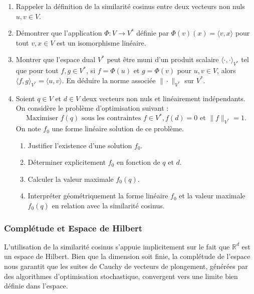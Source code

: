 \documentclass[11pt,a4paper]{report}
\begin{document}
\begin{enumerate}
\def\labelenumi{\arabic{enumi}.}

\item
  Rappeler la définition de la similarité cosinus entre deux vecteurs
  non nuls \(u, v \in V\).
\item
  Démontrer que l'application \(\Phi: V \to V^*\) définie par
  \(\Phi(v)(x) = \langle v, x \rangle\) pour tout \(v, x \in V\) est un
  isomorphisme linéaire.
\item
  Montrer que l'espace dual \(V^*\) peut être muni d'un produit scalaire
  \(\langle \cdot, \cdot \rangle_{V^*}\) tel que pour tout
  \(f, g \in V^*\), si \(f = \Phi(u)\) et \(g = \Phi(v)\) pour
  \(u, v \in V\), alors
  \(\langle f, g \rangle_{V^*} = \langle u, v \rangle\). En déduire la
  norme associée \(\|\cdot\|_{V^*}\) sur \(V^*\).
\item
  Soient \(q \in V\) et \(d \in V\) deux vecteurs non nuls et
  linéairement indépendants. On considère le problème d'optimisation
  suivant :
  \[ \text{Maximiser } f(q) \text{ sous les contraintes } f \in V^*, f(d) = 0 \text{ et } \|f\|_{V^*} = 1. \]
  On note \(f_0\) une forme linéaire solution de ce problème.

  \begin{enumerate}
  \def\labelenumii{\alph{enumii}.}

  \item
    Justifier l'existence d'une solution \(f_0\).
  \item
    Déterminer explicitement \(f_0\) en fonction de \(q\) et \(d\).
  \item
    Calculer la valeur maximale \(f_0(q)\).
  \item
    Interpréter géométriquement la forme linéaire \(f_0\) et la valeur
    maximale \(f_0(q)\) en relation avec la similarité cosinus.
  \end{enumerate}
\end{enumerate}

\hypertarget{compluxe9tude-et-espace-de-hilbert}{%
\subsubsection{Complétude et Espace de
Hilbert}\label{compluxe9tude-et-espace-de-hilbert}}

L'utilisation de la similarité cosinus s'appuie implicitement sur le
fait que \(\mathbb{R}^d\) est un espace de Hilbert. Bien que la
dimension soit finie, la complétude de l'espace nous garantit que les
suites de Cauchy de vecteurs de plongement, générées par des algorithmes
d'optimisation stochastique, convergent vers une limite bien définie
dans l'espace.
\end{document}
